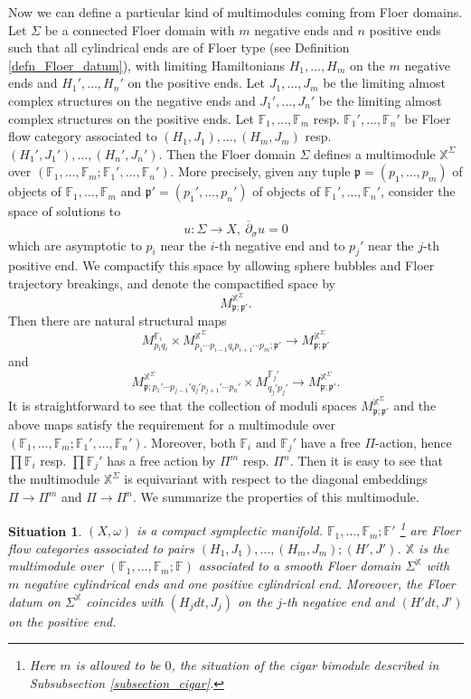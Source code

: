 \documentclass[reqno, 10pt]{amsart}
\numberwithin{equation}{section}
\numberwithin{equation}{section}
\newtheorem{situationm}{Situation}
\theoremstyle{definition}
\theoremstyle{remark}
\newcommand{\beqn}{\begin{equation*}}
\newcommand{\eeqn}{\end{equation*}}
\newcommand{\ov}{\overline}
\newcommand{\mb}{\mathbb}
\newcommand{\mf}{\mathfrak}
\begin{document}
Now we can define a particular kind of multimodules coming from Floer domains. Let $\Sigma$ be a connected Floer domain with $m$ negative ends and $n$ positive ends such that all cylindrical ends are of Floer type (see Definition \ref{defn_Floer_datum}), with limiting Hamiltonians $H_1, \ldots, H_m$ on the $m$ negative ends and $H_1', \ldots, H_n'$ on the positive ends. Let $J_1,\ldots, J_m$ be the limiting almost complex structures on the negative ends and $J_1', \ldots, J_n'$ be the limiting almost complex structures on the positive ends. Let ${\mb F}_1, \ldots, {\mb F}_m$ resp. ${\mb F}_1', \ldots, {\mb F}_n'$ be Floer flow category associated to $(H_1, J_1), \ldots, (H_m, J_m)$ resp. $(H_1', J_1'), \ldots, (H_n', J_n')$.  Then the Floer domain $\Sigma$ defines a multimodule ${\mb X}^\Sigma$ over $({\mb F}_1, \ldots, {\mb F}_m; {\mb F}_1', \ldots, {\mb F}_n')$. More precisely, given any tuple ${\mf p} = (p_1, \ldots, p_m)$ of objects of ${\mb F}_1, \ldots, {\mb F}_m$ and ${\mf p}' = (p_1', \ldots, p_n')$ of objects of ${\mb F}_1', \ldots, {\mb F}_n'$, consider the space of solutions to 
\beqn
u: \Sigma \to X,\ \ov\partial_\sigma u = 0
\eeqn
which are asymptotic to $p_i$ near the $i$-th negative end and to $p_j'$ near the $j$-th positive end. We compactify this space by allowing sphere bubbles and Floer trajectory breakings, and denote the compactified space by 
\beqn
M_{{\mf p};{\mf p}'}^{{\mb X}^\Sigma}.
\eeqn
Then there are natural structural maps
\beqn
M_{p_i q_i}^{{\mb F}_i} \times M_{p_1\cdots p_{i-1} q_i p_{i+1} \cdots p_m; {\mf p}'}^{{\mb X}^\Sigma} \to M_{{\mf p};{\mf p}'}^{{\mb X}^\Sigma}
\eeqn
and
\beqn
M_{{\mf p}; p_1' \cdots p_{j-1}' q_j' p_{j+1}' \cdots p_n'}^{{\mb X}^\Sigma} \times M_{q_j' p_j'}^{{\mb F}_j'} \to M_{{\mf p};{\mf p}'}^{{\mb X}^\Sigma}.
\eeqn
It is straightforward to see that the collection of moduli spaces $M_{{\mf p}; {\mf p}'}^{{\mb X}^\Sigma}$ and the above maps satisfy the requirement for a multimodule over $({\mb F}_1, \ldots, {\mb F}_m; {\mb F}_1', \ldots, {\mb F}_n')$. Moreover, both ${\mb F}_i$ and ${\mb F}_j'$ have a free $\Pi$-action, hence $\prod {\mb F}_i$ resp. $\prod {\mb F}_j'$ has a free action by $\Pi^m$ resp. $\Pi^n$. Then it is easy to see that the multimodule ${\mb X}^\Sigma$ is equivariant with respect to the diagonal embeddings $\Pi \to \Pi^m$ and $\Pi \to \Pi^n$. We summarize the properties of this multimodule.

\begin{situationm}\label{situationm1}
$(X, \omega)$ is a compact symplectic manifold. ${\mb F}_1, \ldots, {\mb F}_m; {\mb F}'$ \footnote{Here $m$ is allowed to be $0$, the situation of the cigar bimodule described in Subsubsection \ref{subsection_cigar}.} are Floer flow categories associated to pairs $(H_1, J_1), \ldots, (H_m, J_m); (H', J')$. ${\mb X}$ is the multimodule over $({\mb F}_1, \ldots, {\mb F}_m; {\mb F})$ associated to a smooth Floer domain $\Sigma^{\mb X}$ with $m$ negative cylindrical ends and one positive cylindrical end. Moreover, the Floer datum on $\Sigma^{\mb X}$ coincides with $(H_j dt, J_j)$ on the $j$-th negative end and $(H' dt, J')$ on the positive end. 
\end{situationm}
\end{document}
